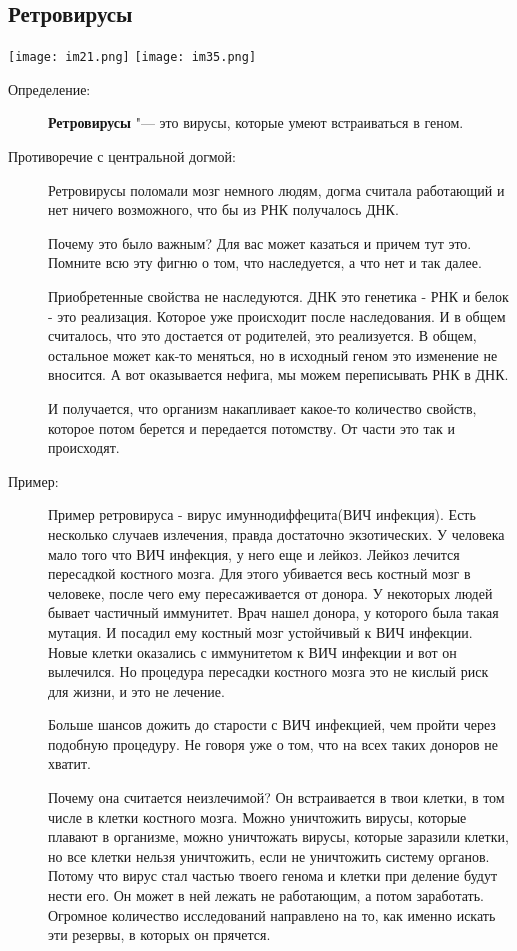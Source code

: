 \subsection{Ретровирусы}
\texttt{[image: im21.png]}
\texttt{[image: im35.png]}
\begin{description}
\item[Определение:] \textbf{Ретровирусы}  "--- это вирусы, которые  умеют встраиваться в геном. 
\item[Противоречие с центральной догмой:]
Ретровирусы поломали мозг немного людям, догма считала работающий и 
нет ничего возможного, что бы из РНК получалось ДНК. 

Почему это было важным? Для вас может казаться и причем тут это. 
Помните всю эту фигню о том, что наследуется, а что нет и так далее. 

Приобретенные свойства не наследуются. ДНК это генетика - РНК и белок - это 
реализация. Которое уже происходит после наследования. И в общем считалось, что 
это достается от родителей, это реализуется. В общем, остальное может как-то меняться, 
но в исходный геном это изменение не вносится. А вот оказывается нефига, 
мы можем переписывать РНК в ДНК. 

И получается, что организм накапливает какое-то количество свойств, 
которое потом берется и передается потомству. От части это так и происходят. 

\item[Пример:]
Пример ретровируса - вирус имуннодиффецита(ВИЧ инфекция). Есть несколько 
случаев излечения, правда достаточно экзотических. У человека мало того что
ВИЧ инфекция, у него еще и лейкоз. Лейкоз лечится пересадкой костного мозга.
Для этого убивается весь костный мозг в человеке,
после чего ему пересаживается от донора. У некоторых
людей бывает частичный иммунитет. Врач нашел донора, у которого была такая
мутация. И посадил ему костный мозг устойчивый к ВИЧ инфекции. Новые клетки
оказались с иммунитетом к ВИЧ инфекции и вот он вылечился. Но процедура
пересадки костного мозга это не кислый риск для жизни, и это не лечение.

Больше шансов дожить до старости с ВИЧ инфекцией, чем пройти через подобную процедуру.
Не говоря уже о том, что на всех таких доноров не хватит.

Почему она считается неизлечимой? Он встраивается в твои клетки, в том
числе в клетки костного мозга. Можно уничтожить вирусы, которые плавают в организме,
можно уничтожать вирусы, которые заразили клетки, но все клетки нельзя уничтожить,
если не уничтожить систему органов. Потому что вирус стал частью твоего генома и
клетки при деление будут нести его. Он может в ней лежать не работающим,
а потом заработать. Огромное количество исследований направлено на то,
как именно искать эти резервы, в которых он прячется.


\end{description}
